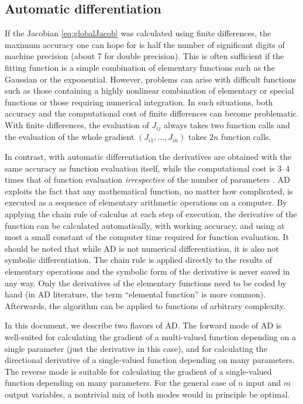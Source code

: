 \documentclass{article}
\begin{document}
\subsection{\label{sec:ad}Automatic differentiation}

If the Jacobian \eqref{eq:globalJacob} was calculated using finite differences, the maximum accuracy one can hope for is half the number of significant digits of machine precision (about 7 for double precision). This is often sufficient if the fitting function is a simple combination of elementary functions such as the Gaussian or the exponential. However, problems can arise with difficult functions such as those containing a highly nonlinear combination of elementary or special functions or those requiring numerical integration. In such situations, both accuracy and the computational cost of finite differences can become problematic. With finite differences, the evaluation of $J_{ij}$ always takes two function calls and the evaluation of the whole gradient $(J_{i1}, \ldots, J_{in})$ takes $2n$ function calls.

In contrast, with automatic differentiation the derivatives are obtained with the same accuracy as function evaluation itself, while the computational cost is 3--4 times that of function evaluation \textit{irrespective} of the number of parameters \cite{griewank08}. AD exploits the fact that any mathematical function, no matter how complicated, is executed as a sequence of elementary arithmetic operations on a computer. By applying the chain rule of calculus at each step of execution, the derivative of the function can be calculated automatically, with working accuracy, and using at most a small constant of the computer time required for function evaluation. It should be noted that while AD is not numerical differentiation, it is also not symbolic differentiation. The chain rule is applied directly to the results of elementary operations and the symbolic form of the derivative is never saved in any way. Only the derivatives of the elementary functions need to be coded by hand (in AD literature, the term ``elemental function'' is more common). Afterwards, the algorithm can be applied to functions of arbitrary complexity.

In this document, we describe two flavors of AD. The forward mode of AD is well-suited for calculating the gradient of a multi-valued function depending on a single parameter (just the derivative in this case), and for calculating the directional derivative of a single-valued function depending on many parameters. The reverse mode is suitable for calculating the gradient of a single-valued function depending on many parameters. For the general case of $n$ input and $m$ output variables, a nontrivial mix of both modes would in principle be optimal.
\end{document}

